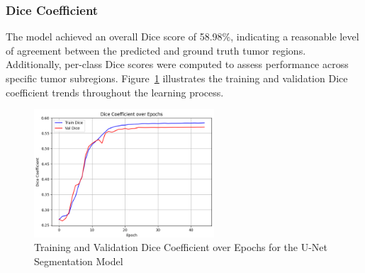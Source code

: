 \subsubsection{Dice Coefficient}
The model achieved an overall Dice score of 58.98\%, indicating a reasonable level of agreement between the predicted and ground truth tumor regions. Additionally, per-class Dice scores were computed to assess performance across specific tumor subregions. Figure~\ref{fig:unet-dice} illustrates the training and validation Dice coefficient trends throughout the learning process.
\begin{figure}[h]
  \centering
  \includegraphics[width=0.6\textwidth]{Images/Chapter3/unet_dice.png}
  \caption{Training and Validation Dice Coefficient over Epochs for the U-Net Segmentation Model}
  \label{fig:unet-dice}
\end{figure}


